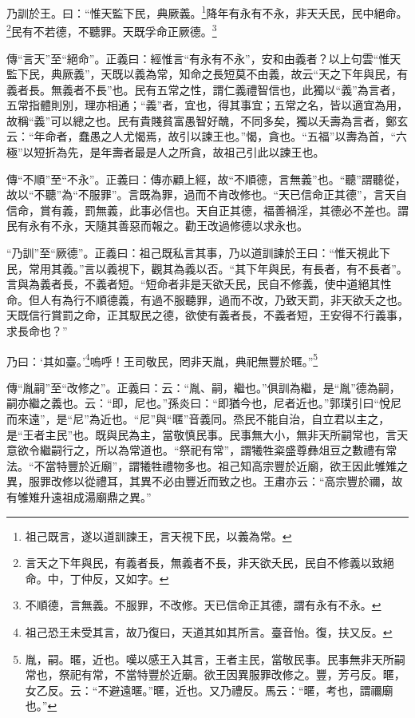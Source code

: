 乃訓於王。曰：“惟天監下民，典厥義。\footnote{祖己既言，遂以道訓諫王，言天視下民，以義為常。}降年有永有不永，非天夭民，民中絕命。\footnote{言天之下年與民，有義者長，無義者不長，非天欲夭民，民自不修義以致絕命。中，丁仲反，又如字。}民有不若德，不聽罪。天既孚命正厥德。\footnote{不順德，言無義。不服罪，不改修。天已信命正其德，謂有永有不永。}


{\noindent\zhuan{}\fzbyks 傳“言天”至“絕命”。正義曰：經惟言“有永有不永”，安和由義者？以上句雲“惟天監下民，典厥義”，天既以義為常，知命之長短莫不由義，故云“天之下年與民，有義者長。無義者不長”也。民有五常之性，謂仁義禮智信也，此獨以“義”為言者，五常指體則別，理亦相通；“義”者，宜也，得其事宜；五常之名，皆以適宜為用，故稱“義”可以總之也。民有貴賤貧富愚智好醜，不同多矣，獨以夭壽為言者，鄭玄云：“年命者，蠢愚之人尤愒焉，故引以諫王也。”愒，貪也。“五福”以壽為首，“六極”以短折為先，是年壽者最是人之所貪，故祖己引此以諫王也。 \par}

{\noindent\zhuan{}\fzbyks 傳“不順”至“不永”。正義曰：傳亦顧上經，故“不順德，言無義”也。“聽”謂聽從，故以“不聽”為“不服罪”。言既為罪，過而不肯改修也。“天已信命正其德”，言天自信命，賞有義，罰無義，此事必信也。天自正其德，福善禍淫，其德必不差也。謂民有永有不永，天隨其善惡而報之。勸王改過修德以求永也。 \par}

{\noindent\shu{}\fzkt “乃訓”至“厥德”。正義曰：祖己既私言其事，乃以道訓諫於王曰：“惟天視此下民，常用其義。”言以義視下，觀其為義以否。“其下年與民，有長者，有不長者”。言與為義者長，不義者短。“短命者非是天欲夭民，民自不修義，使中道絕其性命。但人有為行不順德義，有過不服聽罪，過而不改，乃致天罰，非天欲夭之也。天既信行賞罰之命，正其馭民之德，欲使有義者長，不義者短，王安得不行義事，求長命也？” \par}

乃曰：‘其如臺。’\footnote{祖己恐王未受其言，故乃復曰，天道其如其所言。臺音怡。復，扶又反。}嗚呼！王司敬民，罔非天胤，典祀無豐於暱。”\footnote{胤，嗣。暱，近也。嘆以感王入其言，王者主民，當敬民事。民事無非天所嗣常也，祭祀有常，不當特豐於近廟。欲王因異服罪改修之。豐，芳弓反。暱，女乙反。云：“不避遠暱。”暱，近也。又乃禮反。馬云：“暱，考也，謂禰廟也。”}


{\noindent\zhuan{}\fzbyks 傳“胤嗣”至“改修之”。正義曰：云：“胤、嗣，繼也。”俱訓為繼，是“胤”德為嗣，嗣亦繼之義也。云：“即，尼也。”孫炎曰：“即猶今也，尼者近也。”郭璞引曰“悅尼而來遠”，是“尼”為近也。“尼”與“暱”音義同。烝民不能自治，自立君以主之，是“王者主民”也。既與民為主，當敬慎民事。民事無大小，無非天所嗣常也，言天意欲令繼嗣行之，所以為常道也。“祭祀有常”，謂犧牲粢盛尊彝俎豆之數禮有常法。“不當特豐於近廟”，謂犧牲禮物多也。祖己知高宗豐於近廟，欲王因此雊雉之異，服罪改修以從禮耳，其異不必由豐近而致之也。王肅亦云：“高宗豐於禰，故有雊雉升遠祖成湯廟鼎之異。” \par}


